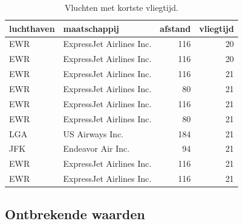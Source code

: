 \documentclass[]{tufte-book}
\newenvironment{Shaded}{}{}
\newcommand{\DataTypeTok}[1]{\textcolor[rgb]{0.56,0.13,0.00}{#1}}
\newcommand{\DecValTok}[1]{\textcolor[rgb]{0.25,0.63,0.44}{#1}}
\newcommand{\KeywordTok}[1]{\textcolor[rgb]{0.00,0.44,0.13}{\textbf{#1}}}
\newcommand{\NormalTok}[1]{#1}
\newcommand{\OperatorTok}[1]{\textcolor[rgb]{0.40,0.40,0.40}{#1}}
\newcommand{\OtherTok}[1]{\textcolor[rgb]{0.00,0.44,0.13}{#1}}
\newcommand{\StringTok}[1]{\textcolor[rgb]{0.25,0.44,0.63}{#1}}
\begin{document}
\begin{Shaded}
\end{Shaded}

\begin{table}

\caption{\label{tab:5-13b}Vluchten met kortste vliegtijd.}
\centering
\fontsize{10}{12}\selectfont
\begin{tabular}[t]{llrr}
\toprule
luchthaven & maatschappij & afstand & vliegtijd\\
\midrule
EWR & ExpressJet Airlines Inc. & 116 & 20\\
EWR & ExpressJet Airlines Inc. & 116 & 20\\
EWR & ExpressJet Airlines Inc. & 116 & 21\\
EWR & ExpressJet Airlines Inc. & 80 & 21\\
EWR & ExpressJet Airlines Inc. & 116 & 21\\
\addlinespace
EWR & ExpressJet Airlines Inc. & 80 & 21\\
LGA & US Airways Inc. & 184 & 21\\
JFK & Endeavor Air Inc. & 94 & 21\\
EWR & ExpressJet Airlines Inc. & 116 & 21\\
EWR & ExpressJet Airlines Inc. & 116 & 21\\
\bottomrule
\end{tabular}
\end{table}

\hypertarget{ontbrekende-waarden}{%
\subsection{Ontbrekende waarden}\label{ontbrekende-waarden}}
\end{document}
